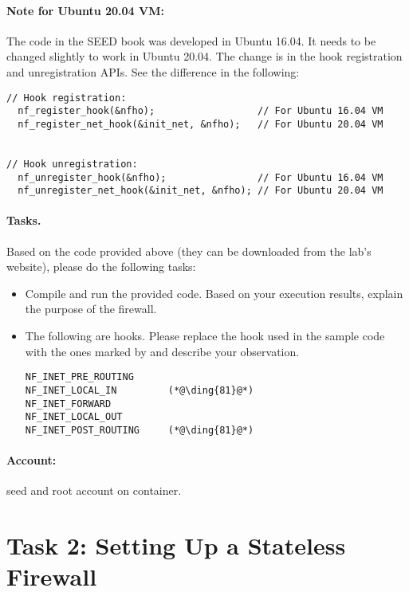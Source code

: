 \paragraph{Note for Ubuntu 20.04 VM:}
The code in the SEED book was developed in Ubuntu 16.04. It needs to be changed slightly 
to work in Ubuntu 20.04. The change is in the hook registration and 
unregistration APIs. See the difference in the following:


\begin{lstlisting}
// Hook registration:
  nf_register_hook(&nfho);                  // For Ubuntu 16.04 VM
  nf_register_net_hook(&init_net, &nfho);   // For Ubuntu 20.04 VM


// Hook unregistration:
  nf_unregister_hook(&nfho);                // For Ubuntu 16.04 VM
  nf_unregister_net_hook(&init_net, &nfho); // For Ubuntu 20.04 VM
\end{lstlisting}
 

\paragraph{Tasks.} Based on the code provided above (they can be downloaded
from the lab's website), please do the following tasks:

\begin{itemize}
\item Compile and run the provided code. Based on your execution results,
explain the purpose of the firewall.  

\item The following are \netfilter hooks. Please replace the 
hook used in the sample code with the ones marked by 
and describe your observation.

\begin{lstlisting}
NF_INET_PRE_ROUTING 
NF_INET_LOCAL_IN         (*@\ding{81}@*)
NF_INET_FORWARD 
NF_INET_LOCAL_OUT 
NF_INET_POST_ROUTING     (*@\ding{81}@*)
\end{lstlisting}
\end{itemize}
 

\paragraph{Account:} 
seed and root account on container. 


\section{Task 2: Setting Up a Stateless Firewall}

